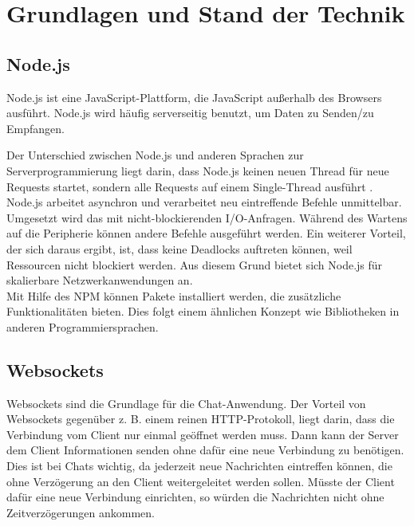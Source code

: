 
\chapter{Grundlagen und Stand der Technik}\label{cha:Grundlagen}
\section{Node.js}\label{sec:Node.JS}
Node.js ist eine JavaScript-Plattform, die JavaScript außerhalb des Browsers ausführt. Node.js wird häufig serverseitig benutzt, um Daten zu Senden/zu Empfangen. \cite[vgl.][]{Node.2019}

Der Unterschied zwischen Node.js und anderen Sprachen zur Serverprogrammierung liegt darin, dass Node.js keinen neuen Thread für neue Requests startet, sondern alle Requests auf einem Single-Thread ausführt \cite[vgl.][3]{Holmes.2013}. Node.js arbeitet asynchron und verarbeitet neu eintreffende Befehle unmittelbar. Umgesetzt wird das mit nicht-blockierenden I/O-Anfragen. Während des Wartens auf die Peripherie können andere Befehle ausgeführt werden. Ein weiterer Vorteil, der sich daraus ergibt, ist, dass keine Deadlocks auftreten können, weil Ressourcen nicht blockiert werden. Aus diesem Grund bietet sich Node.js für skalierbare Netzwerkanwendungen an. \cite[vgl.][4]{Holmes.2013}\\
Mit Hilfe des \acf{NPM} können Pakete installiert werden, die zusätzliche Funktionalitäten bieten. Dies folgt einem ähnlichen Konzept wie Bibliotheken in anderen Programmiersprachen.

\section{Websockets}\label{sec:Websockets}
Websockets sind die Grundlage für die Chat-Anwendung. Der Vorteil von Websockets gegenüber z. B. einem reinen \ac{HTTP}-Protokoll, liegt darin, dass die Verbindung vom Client nur einmal geöffnet werden muss. Dann kann der Server dem Client Informationen senden ohne dafür eine neue Verbindung zu benötigen. Dies ist bei Chats wichtig, da jederzeit neue Nachrichten eintreffen können, die ohne Verzögerung an den Client weitergeleitet werden sollen. Müsste der Client dafür eine neue Verbindung einrichten, so würden die Nachrichten nicht ohne Zeitverzögerungen ankommen.
